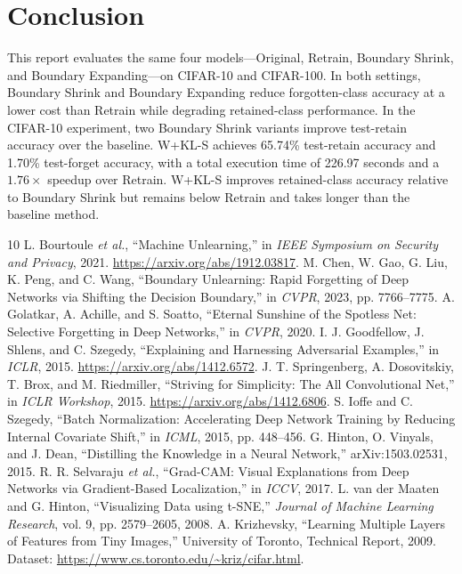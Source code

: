 \documentclass[conference]{IEEEtran}
\begin{document}
\section{Conclusion}
This report evaluates the same four models---Original, Retrain, Boundary Shrink, and Boundary Expanding---on CIFAR-10 and CIFAR-100. In both settings, Boundary Shrink and Boundary Expanding reduce forgotten-class accuracy at a lower cost than Retrain while degrading retained-class performance. In the CIFAR-10 experiment, two Boundary Shrink variants improve test-retain accuracy over the baseline. W+KL-S achieves 65.74\% test-retain accuracy and 1.70\% test-forget accuracy, with a total execution time of 226.97 seconds and a $1.76\times$ speedup over Retrain. W+KL-S improves retained-class accuracy relative to Boundary Shrink but remains below Retrain and takes longer than the baseline method.

\begin{thebibliography}{10}
L. Bourtoule \textit{et al.}, ``Machine Unlearning,'' in \textit{IEEE Symposium on Security and Privacy}, 2021. \url{https://arxiv.org/abs/1912.03817}.
M. Chen, W. Gao, G. Liu, K. Peng, and C. Wang, ``Boundary Unlearning: Rapid Forgetting of Deep Networks via Shifting the Decision Boundary,'' in \textit{CVPR}, 2023, pp. 7766--7775.
A. Golatkar, A. Achille, and S. Soatto, ``Eternal Sunshine of the Spotless Net: Selective Forgetting in Deep Networks,'' in \textit{CVPR}, 2020.
I. J. Goodfellow, J. Shlens, and C. Szegedy, ``Explaining and Harnessing Adversarial Examples,'' in \textit{ICLR}, 2015. \url{https://arxiv.org/abs/1412.6572}.
J. T. Springenberg, A. Dosovitskiy, T. Brox, and M. Riedmiller, ``Striving for Simplicity: The All Convolutional Net,'' in \textit{ICLR Workshop}, 2015. \url{https://arxiv.org/abs/1412.6806}.
S. Ioffe and C. Szegedy, ``Batch Normalization: Accelerating Deep Network Training by Reducing Internal Covariate Shift,'' in \textit{ICML}, 2015, pp. 448--456.
G. Hinton, O. Vinyals, and J. Dean, ``Distilling the Knowledge in a Neural Network,'' arXiv:1503.02531, 2015.
R. R. Selvaraju \textit{et al.}, ``Grad-CAM: Visual Explanations from Deep Networks via Gradient-Based Localization,'' in \textit{ICCV}, 2017.
L. van der Maaten and G. Hinton, ``Visualizing Data using t-SNE,'' \textit{Journal of Machine Learning Research}, vol. 9, pp. 2579--2605, 2008.
A. Krizhevsky, ``Learning Multiple Layers of Features from Tiny Images,'' University of Toronto, Technical Report, 2009. Dataset: \url{https://www.cs.toronto.edu/~kriz/cifar.html}.
\end{thebibliography}
\onecolumn
\nobalance
\appendices
\end{document}
